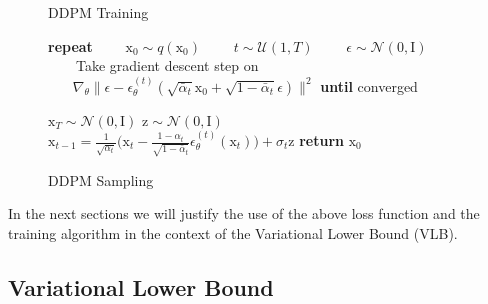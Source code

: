 \begin{figure}[ht]\label{alg:ddpm-training-sampling}
    \begin{minipage}{0.45\textwidth}
    \begin{algorithm}[H]
        \caption{DDPM Training}
        \begin{algorithmic}
            \STATE \textbf{repeat}
            \STATE  ~~~~$\mathrm{x}_{0}\sim q(\mathrm{x_{0}})$
            \STATE  ~~~~$t\sim \mathcal{U}(1, T)$
            \STATE  ~~~~$\epsilon\sim \mathcal{N}(0, \mathrm{I})$
            \STATE  ~~~~Take gradient descent step on
            \STATE  $~~~~~~~~\nabla_{\theta}\|\epsilon - \epsilon_{\theta}^{(t)}(\sqrt{\bar{\alpha}_{t}}\mathrm{x}_{0} + \sqrt{1-\bar{\alpha}_{t}}\epsilon) \|^{2}$
            \STATE \textbf{until} converged
        \end{algorithmic}
    \end{algorithm}
    \end{minipage}
    \hspace{0.25cm}
    \begin{minipage}{0.45\textwidth}
    \begin{algorithm}[H]
        \caption{DDPM Sampling}
        \begin{algorithmic}
        \STATE  $\mathrm{x}_{T}\sim\mathcal{N}(\mathrm{0}, \mathrm{I})$
            \STATE $\mathrm{z}\sim\mathcal{N}(0, \mathrm{I})$
            \STATE $\mathrm{x}_{t-1}=\frac{1}{\sqrt{\alpha_{t}}} \bigg(\mathrm{x}_{t} - \frac{1-\alpha_{t}}{\sqrt{1-\bar{\alpha}_{t}}}\epsilon_{\theta}^{(t)}(\mathrm{x}_{t})\bigg) + \sigma_{t}\mathrm{z}$
        \ENDFOR
        \STATE \textbf{return} $\mathrm{x}_{0}$
        \end{algorithmic}
    \end{algorithm}
    \end{minipage}
    \end{figure}


\noindent In the next sections we will justify the use of the above loss function and the training algorithm in the context of the Variational Lower Bound (VLB).

\subsection{Variational Lower Bound}\label{sec:variational-lower-bound}


